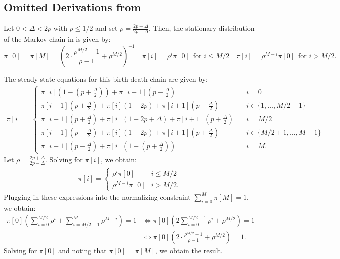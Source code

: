 \documentclass[mnsc,nonblindrev]{informs3}
\renewenvironment{proof}[1][Proof]{%
  \par\noindent{\itshape #1.} \ignorespaces
}{%
  \hfill\Halmos\par
}
\begin{document}
\begin{APPENDICES}
\OneAndAHalfSpacedXI %
\section{Omitted Derivations from }\label{mc:deriv}

\begin{proposition}
\label{prop:mc_stationary_measure}
Let $0 < \Delta < 2p$ with $p \leq 1/2$ and set $\rho = \frac{2p+\Delta}{2p-\Delta}$.  Then, the stationary distribution of the Markov chain in  is given by:
\[
\pi[0] = \pi[M] = \left(2 \cdot \frac{\rho^{M/2} - 1}{\rho - 1} + \rho^{M/2}\right)^{-1} \quad \pi[i] = \rho^{i}\pi[0] \, \text{ for } i \leq M/2 \quad \pi[i] = \rho^{M-i}\pi[0] \, \text{ for } i > M/2.
\]
\end{proposition}
\begin{proof}
The steady-state equations for this birth-death chain are given by:
\begin{align*}
\pi[i] = 
\begin{cases}
 \pi[i]\left(1-\left(p+\frac\Delta2\right)\right) + \pi[i+1]\left(p-\frac\Delta2\right) \quad & i = 0\\
\pi[i-1]\left(p+\frac\Delta2\right) + \pi[i](1-2p) + \pi[i+1]\left(p-\frac\Delta2\right) \quad & i \in \{1,\ldots,M/2-1\}\\
 \pi[i-1]\left(p+\frac\Delta2\right) + \pi[i](1-2p+\Delta) + \pi[i+1]\left(p+\frac\Delta2\right) \quad & i = M/2\\
\pi[i-1]\left(p-\frac\Delta2\right) + \pi[i](1-2p) + \pi[i+1]\left(p+\frac\Delta2\right)  \quad &i \in \{M/2+1,\ldots,M-1\} \\
\pi[i-1]\left(p-\frac\Delta2\right) + \pi[i]\left(1-\left(p+\frac\Delta2\right)\right) \quad & i = M.
\end{cases}
\end{align*}
Let $\rho = \frac{2p+\Delta}{2p-\Delta}$. Solving for $\pi[i]$, we obtain:
\begin{align*}
\pi[i] = \begin{cases}
\rho^i \pi[0] & i \leq M/2 \\
\rho^{M-i}\pi[0] & i > M/2.
\end{cases}
\end{align*}
Plugging in these expressions into the normalizing constraint $\sum_{i=0}^{M}\pi[M] = 1$, we obtain:
\begin{align*}
\pi[0]\left(\sum_{i=0}^{M/2}\rho^i + \sum_{i=M/2+1}^{M}\rho^{M-i}\right) = 1 &\iff \pi[0]\left( 2 \sum_{i=0}^{M/2-1}\rho^i + \rho^{M/2}\right) = 1 \\
&\iff \pi[0]\left(2 \cdot \frac{\rho^{M/2}-1}{\rho-1}+\rho^{M/2}\right) = 1.
\end{align*}
Solving for $\pi[0]$ and noting that $\pi[0] = \pi[M]$, we obtain the result.
\end{proof}




\end{APPENDICES}
\end{document}
